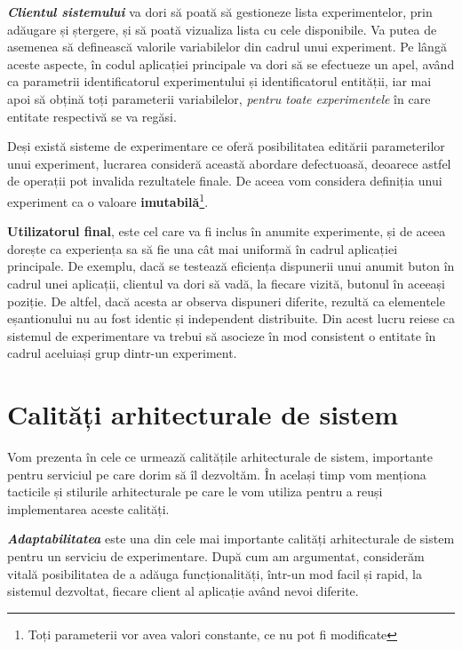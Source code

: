 \textbf{\textit{Clientul sistemului}} va dori să poată să gestioneze lista experimentelor, prin adăugare și ștergere, și să poată vizualiza lista cu cele disponibile. Va putea de asemenea să definească valorile variabilelor din cadrul unui experiment. Pe lângă aceste aspecte, în codul aplicației principale va dori să se efectueze un apel, având ca parametrii identificatorul experimentului și identificatorul entității, iar mai apoi să obțină toți parameterii variabilelor, \textit{pentru toate experimentele} în care entitate respectivă se va regăsi.

\begin{remark}
	Deși există sisteme de experimentare ce oferă posibilitatea editării parameterilor unui experiment, lucrarea consideră această abordare defectuoasă, deoarece astfel de operații pot invalida rezultatele finale. De aceea vom considera definiția unui experiment ca o valoare \textbf{imutabilă}\footnote{Toți parameterii vor avea valori constante, ce nu pot fi modificate}. 
\end{remark}

\textbf{\textbf{Utilizatorul final}}, este cel care va fi inclus în anumite experimente, și de aceea dorește ca experiența sa să fie una cât mai uniformă în cadrul aplicației principale. De exemplu, dacă se testează eficiența dispunerii unui anumit buton în cadrul unei aplicații, clientul va dori să vadă, la fiecare vizită, butonul în aceeași poziție. De altfel, dacă acesta ar observa dispuneri diferite, rezultă ca elementele eșantionului nu au fost identic și independent distribuite. Din acest lucru reiese ca sistemul de experimentare va trebui să asocieze în mod consistent o entitate în cadrul aceluiași grup dintr-un experiment. 

\section{Calități arhitecturale de sistem}

Vom prezenta în cele ce urmează calitățile arhitecturale de sistem, importante pentru serviciul pe care dorim să îl dezvoltăm. În același timp vom menționa tacticile și stilurile arhitecturale pe care le vom utiliza pentru a reuși implementarea aceste calități.

\textbf{\textit{Adaptabilitatea}} este una din cele mai importante calități arhitecturale de sistem pentru un serviciu de experimentare. După cum am argumentat, considerăm vitală posibilitatea de a adăuga funcționalități, într-un mod facil și rapid, la sistemul dezvoltat, fiecare client al aplicație având nevoi diferite.


